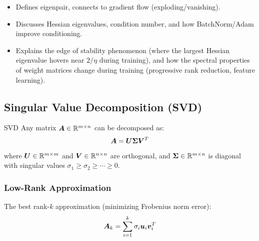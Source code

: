 \begin{interviewq}

\goodgreat
\begin{itemize}
    \item {} Defines eigenpair, connects to gradient flow (exploding/vanishing).
    \item {} Discusses Hessian eigenvalues, condition number, and how BatchNorm/Adam improve conditioning.
    \item {} Explains the edge of stability phenomenon (where the largest Hessian eigenvalue hovers near $2/\eta$ during training), and how the spectral properties of weight matrices change during training (progressive rank reduction, feature learning).
\end{itemize}

\end{interviewq}

\subsection{Singular Value Decomposition (SVD)}

\begin{mathresult}{SVD}
Any matrix $\bm{A} \in \mathbb{R}^{m \times n}$ can be decomposed as:
\begin{equation}
\bm{A} = \bm{U} \bm{\Sigma} \bm{V}^T
\end{equation}
where $\bm{U} \in \mathbb{R}^{m \times m}$ and $\bm{V} \in \mathbb{R}^{n \times n}$ are orthogonal, and $\bm{\Sigma} \in \mathbb{R}^{m \times n}$ is diagonal with singular values $\sigma_1 \geq \sigma_2 \geq \cdots \geq 0$.
\end{mathresult}

\subsubsection{Low-Rank Approximation}

The best rank-$k$ approximation (minimizing Frobenius norm error):
\begin{equation}
\bm{A}_k = \sum_{i=1}^k \sigma_i \bm{u}_i \bm{v}_i^T
\end{equation}

